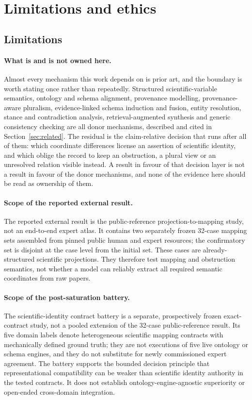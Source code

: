 \section{Limitations and ethics}
\label{sec:limitations}

\subsection{Limitations}

\paragraph{What is and is not owned here.}
Almost every mechanism this work depends on is prior art, and the boundary is
worth stating once rather than repeatedly. Structured scientific-variable
semantics, ontology and schema alignment, provenance modelling,
provenance-aware pluralism, evidence-linked schema induction and fusion,
entity resolution, stance and contradiction analysis, retrieval-augmented
synthesis and generic consistency checking are all donor mechanisms, described
and cited in Section~\ref{sec:related}. The residual is the claim-relative
decision that runs after all of them: which coordinate differences license an
assertion of scientific identity, and which oblige the record to keep an
obstruction, a plural view or an unresolved relation visible instead. A result
in favour of that decision layer is not a result in favour of the donor
mechanisms, and none of the evidence here should be read as ownership of them.

\paragraph{Scope of the reported external result.}
The reported external result is the public-reference projection-to-mapping
study, not an end-to-end expert atlas. It contains two separately frozen
32-case mapping sets assembled from pinned public human and expert resources;
the confirmatory set is disjoint at the case level from the initial set. These
cases are already-structured scientific projections. They therefore test
mapping and obstruction semantics, not whether a model can reliably extract
all required semantic coordinates from raw papers.

\paragraph{Scope of the post-saturation battery.}
The scientific-identity contract battery is a separate, prospectively frozen
exact-contract study, not a pooled extension of the 32-case public-reference
result. Its five domain labels denote heterogeneous scientific mapping
contracts with mechanically defined ground truth; they are not executions of
five live ontology or schema engines, and they do not substitute for newly
commissioned expert agreement. The battery supports the bounded decision
principle that representational compatibility can be weaker than scientific
identity authority in the tested contracts. It does not establish
ontology-engine-agnostic superiority or open-ended cross-domain integration.

